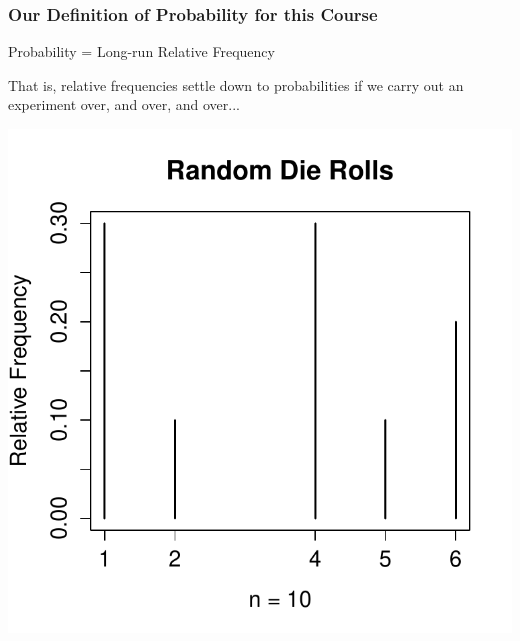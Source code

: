 \documentclass[handout]{beamer}
\begin{document}


\begin{frame}
\frametitle{Our Definition of Probability for this Course}
\begin{center}
\Large
Probability  = Long-run Relative Frequency
\end{center}

\vspace{3em}
\alert{That is, relative frequencies settle down to probabilities if we carry out an experiment over, and over, and over...}
\end{frame}
\begin{frame}

\centering
\includegraphics[scale = 0.7]{./images/die1}

\end{frame}
\end{document}
